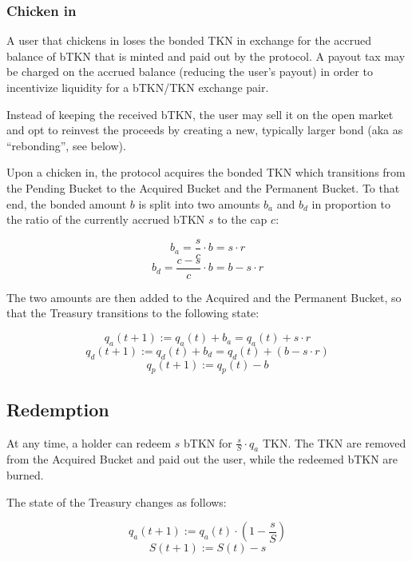\documentclass{article}
\begin{document}
\subsubsection{Chicken in}
A user that chickens in loses the bonded TKN in exchange for the accrued balance of bTKN that is minted and paid out by the protocol. A payout tax may be charged on the accrued balance (reducing the user’s payout) in order to incentivize liquidity for a bTKN/TKN exchange pair.

Instead of keeping the received bTKN, the user may sell it on the open market and opt to reinvest the proceeds by creating a new, typically larger bond (aka as “rebonding”, see below).

Upon a chicken in, the protocol acquires the bonded TKN which transitions from the Pending Bucket to the Acquired Bucket and the Permanent Bucket. To that end, the bonded amount $b$ is split into two amounts $b_a$ and $b_d$ in proportion to the ratio of the currently accrued bTKN $s$ to the cap $c$:

$$b_a = \frac{s}{c} \cdot b = s \cdot r$$
$$b_d = \frac{c-s}{c} \cdot b = b - s \cdot r$$

The two amounts are then added to the Acquired and the Permanent Bucket, so that the Treasury transitions to the following state:

$$q_a(t+1) := q_a(t) + b_a = q_a(t) + s \cdot r $$
$$q_d(t+1) := q_d(t) + b_d = q_d(t) + (b - s \cdot r)$$
$$q_p(t+1) := q_p(t) - b$$

\subsection{Redemption}
At any time, a holder can redeem $s$ bTKN for $\frac{s}{S}\cdot q_a$ TKN.
The TKN are removed from the Acquired Bucket and paid out the user, while the redeemed bTKN are burned.

The state of the Treasury changes as follows: 

$$q_a(t+1) := q_a(t) \cdot (1 - \frac{s}{S})$$
$$S(t+1) := S(t) - s$$
\end{document}
